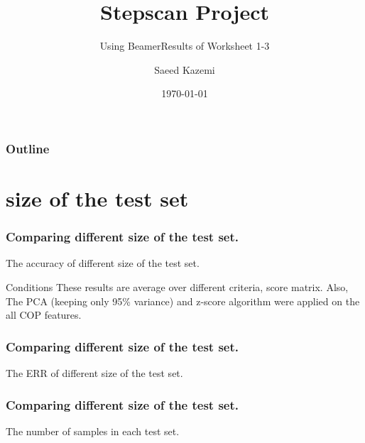 \documentclass{beamer}
\subtitle{Using Beamer}
\title{ \textbf{Stepscan Project}}
\subtitle{Results of Worksheet 1-3}
\date{\today}
\author{Saeed Kazemi}
\institute{ University of New Brunswick}
\begin{document}
\begin{frame}
\titlepage
\end{frame}


\begin{frame}
\frametitle{Outline}
\tableofcontents
\end{frame}


\section{size of the test set}

\begin{frame}
\frametitle{Comparing different size of the test set.}
\tiny
\begin{table}
\centering
\captionsetup{labelformat=empty}
\caption{\small The accuracy of different size of the test set.}
\label{tab:parameters condition}

\end{table}
\begin{block}{\small Conditions}
    \footnotesize These results are average over different criteria, score matrix. Also, The PCA (keeping only 95\% variance) and z-score algorithm were applied on the all COP features.
\end{block}

\end{frame}
\begin{frame}
\frametitle{Comparing different size of the test set.}
\tiny
\begin{table}
\centering
\captionsetup{labelformat=empty}
\caption{\small The  ERR of different size of the test set.}
\label{tab:parameters condition}

\end{table}
\end{frame}
\begin{frame}
\frametitle{Comparing different size of the test set.}
\tiny
\begin{table}
\centering
\captionsetup{labelformat=empty}
\caption{\small The number of samples in each test set.}
\label{tab:parameters condition}

\end{table}
\end{frame}
\end{document}

